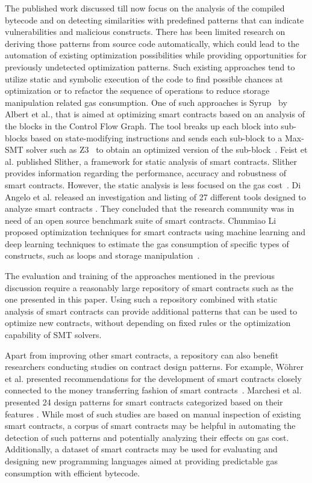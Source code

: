 \documentclass[10pt,conference]{IEEEtran}
\begin{document}
	The published work discussed till now focus on the analysis of the compiled bytecode and on detecting similarities with predefined patterns that can indicate vulnerabilities and malicious constructs. There has been limited research on deriving those patterns from source code automatically, which could lead to the automation of existing optimization possibilities while providing opportunities for previously undetected optimization patterns. Such existing approaches tend to utilize static and symbolic execution of the code to find possible chances at optimization or to refactor the sequence of operations to reduce storage manipulation related gas consumption. One of such approaches is Syrup~\cite{superoptimization} by Albert et al., that is aimed at optimizing smart contracts based on an analysis of the blocks in the Control Flow Graph. The tool breaks up each block into sub-blocks based on state-modifying instructions and sends each sub-block to a Max-SMT solver such as Z3~\cite{z3solver} to obtain an optimized version of the sub-block~\cite{superoptimization}. Feist et al. published Slither, a framework for static analysis of smart contracts. Slither provides information regarding the performance, accuracy and robustness of smart contracts. However, the static analysis is less focused on the gas cost~\cite{slither}. Di Angelo et al. released an investigation and listing of 27 different tools designed to analyze smart contracts \cite{diangelo}. They concluded that the research community was in need of an open source benchmark suite of smart contracts. Chunmiao Li proposed optimization techniques for smart contracts using machine learning and deep learning techniques to estimate the gas consumption of specific types of constructs, such as loops and storage manipulation~\cite{chunmiaoli}. 
	
	The evaluation and training of the approaches mentioned in the previous discussion require a reasonably large repository of smart contracts such as the one presented in this paper. Using such a repository combined with static analysis of smart contracts can provide additional patterns that can be used to optimize new contracts, without depending on fixed rules or the optimization capability of SMT solvers.
	
	Apart from improving other smart contracts, a repository can also benefit researchers conducting studies on contract design patterns. For example, Wöhrer et al. presented recommendations for the development of smart contracts closely connected to the money transferring fashion of smart contracts~\cite{wohrer}. Marchesi et al. presented 24 design patterns for smart contracts categorized based on their features \cite{marchesi}. While most of such studies are based on manual inspection of existing smart contracts, a corpus of smart contracts may be helpful in automating the detection of such patterns and potentially analyzing their effects on gas cost. Additionally, a dataset of smart contracts may be used for evaluating and designing new programming languages aimed at providing predictable gas consumption with efficient bytecode.
	
\end{document}
